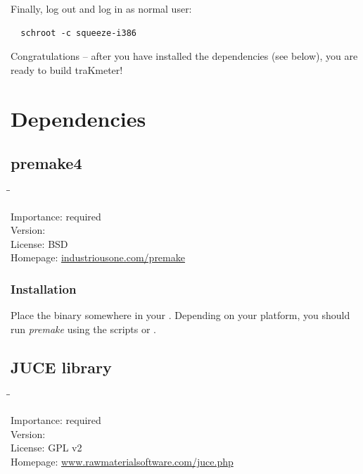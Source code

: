 Finally, log out and log in as normal user:

\begin{verbatim}
  schroot -c squeeze-i386
\end{verbatim}

Congratulations -- after you have installed the dependencies (see
below), you are ready to build traKmeter!

\section{Dependencies}

\subsection{premake4}

\begin{tabbing}
  \hspace*{6em}\=\=\kill

  Importance:  \> required \\
  Version:      \\
  License:     \> BSD \\
  Homepage:    \> \href{http://industriousone.com/premake}{industriousone.com/premake}
\end{tabbing}

\subsubsection{Installation}

Place the binary somewhere in your .  Depending on your
platform, you should run \emph{premake} using the scripts
 or .

\subsection{JUCE library}

\begin{tabbing}
  \hspace*{6em}\=\=\kill

  Importance:  \> required \\
  Version:      \\
  License:     \> GPL v2 \\
  Homepage:    \> \href{http://www.rawmaterialsoftware.com/juce.php}{www.rawmaterialsoftware.com/juce.php}
\end{tabbing}

